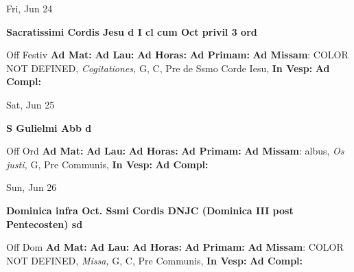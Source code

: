 \documentclass[10pt]{memoir}
\begin{document}
\begin{center}
\begin{minipage}{3.5in}
\vspace{2em}
\begin{center}Fri, Jun 24
\end{center}
\textbf{ \large Sacratissimi Cordis Jesu
\textnormal{\normalsize d I cl cum Oct privil 3 ord}}

\begin{justify}Off Festiv
\textbf{Ad Mat: }
\textbf{Ad Lau: }
\textbf{Ad Horas: }
\textbf{Ad Primam: }\textbf{Ad Missam}: COLOR NOT DEFINED, \textit{Cogitationes,} G, C, Pre de Ssmo Corde Iesu, 
\textbf{In Vesp: }
\textbf{Ad Compl: }
\end{justify}
\end{minipage}
\end{center}

\begin{center}
\begin{minipage}{3.5in}
\vspace{2em}
\begin{center}Sat, Jun 25
\end{center}
\textbf{ \large S Gulielmi Abb
\textnormal{\normalsize d}}

\begin{justify}Off Ord
\textbf{Ad Mat: }
\textbf{Ad Lau: }
\textbf{Ad Horas: }
\textbf{Ad Primam: }\textbf{Ad Missam}: albus, \textit{Os justi,} G, Pre Communis, 
\textbf{In Vesp: }
\textbf{Ad Compl: }
\end{justify}
\end{minipage}
\end{center}

\begin{center}
\begin{minipage}{3.5in}
\vspace{2em}
\begin{center}Sun, Jun 26
\end{center}
\textbf{ \large Dominica infra Oct. Ssmi Cordis DNJC (Dominica III post Pentecosten)
\textnormal{\normalsize sd}}

\begin{justify}Off Dom
\textbf{Ad Mat: }
\textbf{Ad Lau: }
\textbf{Ad Horas: }
\textbf{Ad Primam: }\textbf{Ad Missam}: COLOR NOT DEFINED, \textit{Missa,} G, C, Pre Communis, 
\textbf{In Vesp: }
\textbf{Ad Compl: }
\end{justify}
\end{minipage}
\end{center}
\end{document}
